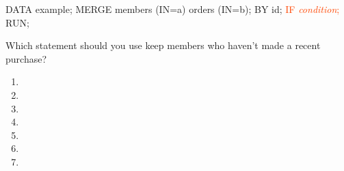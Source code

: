 \begin{frame}[fragile]
\footnotesize
\begin{code}{.0}
DATA example;
   MERGE members (IN=a)
         orders  (IN=b);
    BY id;
    \textcolor{OrangeRed}{IF \emph{condition};}
RUN;
\end{code}
\emp
{} \hspace{0.05in} \emp
{}
\begin{clicker}{Which  statement should you use keep members who haven't made a recent purchase?}
\begin{enumerate}
\item {}
\item {}
\item {}
\item {}
\item {}
\item {}
\item {}
\end{enumerate}
\end{clicker}

\emp
\end{frame}

 